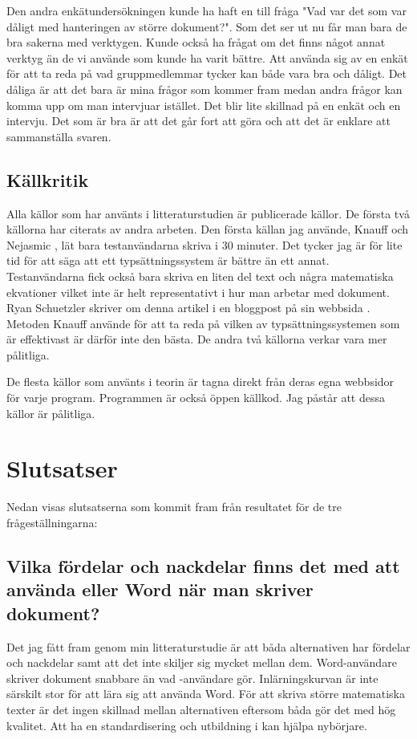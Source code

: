 Den andra enkätundersökningen kunde ha haft en till fråga "Vad var det som var dåligt med hanteringen av större dokument?". Som det ser ut nu får man bara de bra sakerna med verktygen. Kunde också ha frågat om det finns något annat verktyg än de vi använde som kunde ha varit bättre. Att använda sig av en enkät för att ta reda på vad gruppmedlemmar tycker kan både vara bra och dåligt. Det dåliga är att det bara är mina frågor som kommer fram medan andra frågor kan komma upp om man intervjuar istället. Det blir lite skillnad på en enkät och en intervju. Det som är bra är att det går fort att göra och att det är enklare att sammanställa svaren.

\subsection{Källkritik}
Alla källor som har använts i litteraturstudien är publicerade källor. De första två källorna har citerats av andra arbeten. Den första källan jag använde, Knauff och Nejasmic \cite{knauff2014efficiency}, lät bara testanvändarna skriva i 30 minuter. Det tycker jag är för lite tid för att säga att ett typsättningssystem är bättre än ett annat. Testanvändarna fick också bara skriva en liten del text och några matematiska ekvationer vilket inte är helt representativt i hur man arbetar med dokument. Ryan Schuetzler skriver om denna artikel i en bloggpost på sin webbsida \cite{ryan_sch}. Metoden Knauff använde för att ta reda på vilken av typsättningssystemen som är effektivast är därför inte den bästa. De andra två källorna verkar vara mer pålitliga.

De flesta källor som använts i teorin är tagna direkt från deras egna webbsidor för varje program. Programmen är också öppen källkod. Jag påstår att dessa källor är pålitliga.

\section{Slutsatser}
\label{sec:conclusions-tuhkala}
Nedan visas slutsatserna som kommit fram från resultatet för de tre frågeställningarna:

\subsection{Vilka fördelar och nackdelar finns det med att använda \latex eller Word när man skriver dokument?}
Det jag fått fram genom min litteraturstudie är att båda alternativen har fördelar och nackdelar samt att det inte skiljer sig mycket mellan dem. Word-användare skriver dokument snabbare än vad \latex-användare gör. Inlärningskurvan är inte särskilt stor för att lära sig att använda Word. För att skriva större matematiska texter är det ingen skillnad mellan alternativen eftersom båda gör det med hög kvalitet. Att ha en standardisering och utbildning i \latex kan hjälpa nybörjare.

